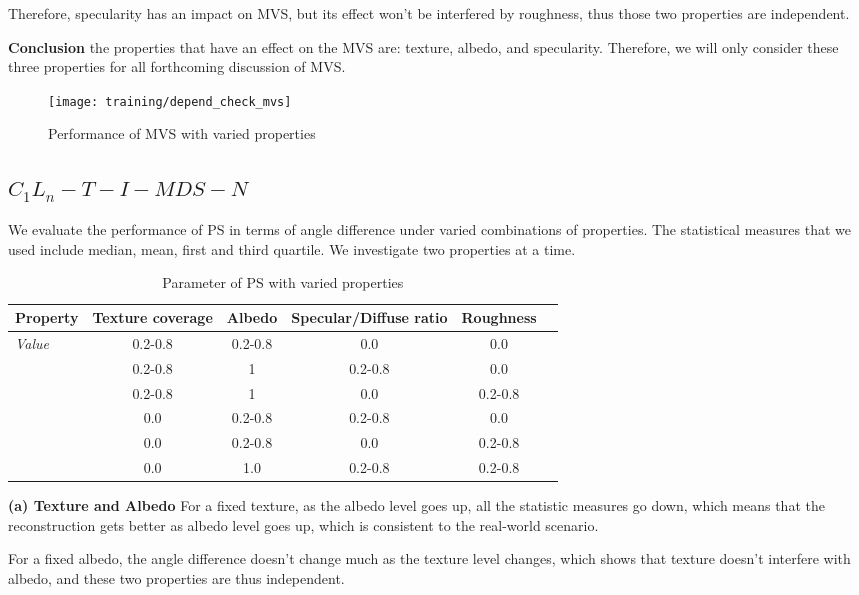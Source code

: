 Therefore, specularity has an impact on MVS, but its effect won't be interfered by roughness, thus those two properties are independent.

\textbf{Conclusion} the properties that have an effect on the MVS are: texture, albedo, and specularity. Therefore, we will only consider these three properties for all forthcoming discussion of MVS.

\begin{figure}[h!]
\texttt{[image: training/depend\_check\_mvs]}
\caption{Performance of MVS with varied properties}
\label{fig:depend_check_mvs}
\end{figure}

\subsection{$C_1L_n-T-I-MDS-N$}
We evaluate the performance of PS in terms of angle difference under varied combinations of properties. The statistical measures that we used include median, mean, first and third quartile. We investigate two properties at a time.

\begin{table}[h]
  \centering
  \begin{tabular}{l*{5}{c}}
  \hline
  \textbf{Property} & Texture coverage & Albedo & Specular/Diffuse ratio & Roughness\\
  \hline
  \textit{Value} & 0.2-0.8 & 0.2-0.8 & 0.0 & 0.0\\
                 & 0.2-0.8 & 1 & 0.2-0.8 & 0.0\\
                 & 0.2-0.8 & 1 & 0.0 & 0.2-0.8\\
                 & 0.0 & 0.2-0.8 & 0.2-0.8 & 0.0\\
                 & 0.0 & 0.2-0.8 & 0.0 & 0.2-0.8\\
                 & 0.0 & 1.0 & 0.2-0.8 & 0.2-0.8\\
  \hline
  \end{tabular}
  \caption{Parameter of PS with varied properties}
\end{table}

\textbf{(a) Texture and Albedo} 
For a fixed texture, as the albedo level goes up, all the statistic measures go down, which means that the reconstruction gets better as albedo level goes up, which is consistent to the real-world scenario.

For a fixed albedo, the angle difference doesn't change much as the texture level changes, which shows that texture doesn't interfere with albedo, and these two properties are thus independent.

